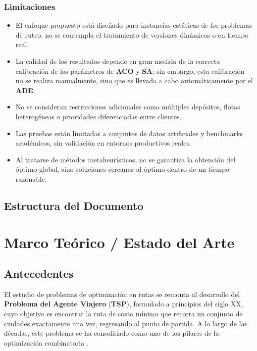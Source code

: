 \documentclass[12pt,titlepage,twoside,openright]{book}
\begin{document}
\subsection*{Limitaciones}

\begin{itemize}
	\item El enfoque propuesto está diseñado para instancias estáticas de los problemas de ruteo; no se contempla el tratamiento de versiones dinámicas o en tiempo real.

	\item La calidad de los resultados depende en gran medida de la correcta calibración de los parámetros de \textbf{ACO} y \textbf{SA}; sin embargo, esta calibración no se realiza manualmente, sino que es llevada a cabo automáticamente por el \textbf{ADE}.

	\item No se consideran restricciones adicionales como múltiples depósitos, flotas heterogéneas o prioridades diferenciadas entre clientes.

	\item Las pruebas están limitadas a conjuntos de datos artificiales y benchmarks académicos, sin validación en entornos productivos reales.

	\item Al tratarse de métodos metaheurísticos, no se garantiza la obtención del óptimo global, sino soluciones cercanas al óptimo dentro de un tiempo razonable.
\end{itemize}

\section{Estructura del Documento}

\chapter{Marco Teórico / Estado del Arte}
\label{cap:marco-teorico}
\section{Antecedentes}

El estudio de problemas de optimización en rutas se remonta al desarrollo del \textbf{Problema del Agente Viajero} (\textbf{TSP}), formulado a principios del siglo XX, cuyo objetivo es encontrar la ruta de costo mínimo que recorra un conjunto de ciudades exactamente una vez, regresando al punto de partida. A lo largo de las décadas, este problema se ha consolidado como uno de los pilares de la optimización combinatoria \citep{papadimitriou1994}.
\end{document}
